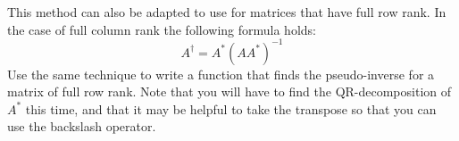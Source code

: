 \begin{problem}
This method can also be adapted to use for matrices that have full row rank. In the case of full column rank the following formula holds:
\[
A^\dagger = A^*(A A^*)^{-1}
\]
Use the same technique to write a function that finds the pseudo-inverse for a matrix of full row rank. Note that you will have to find the QR-decomposition of $A^*$ this time, and that it may be helpful to take the transpose so that you can use the backslash operator.
\end{problem}
